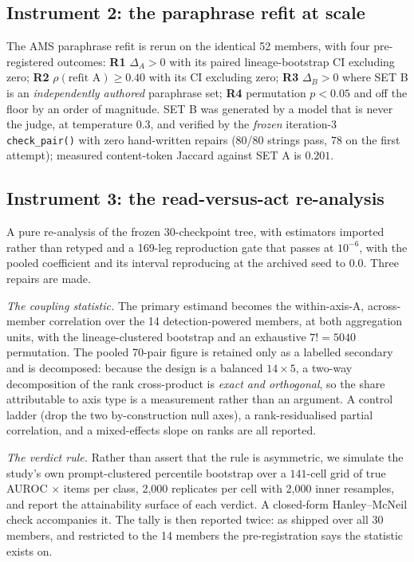 \documentclass[11pt,letterpaper]{article}
\begin{document}
\subsection{Instrument 2: the paraphrase refit at scale}

The AMS paraphrase refit is rerun on the identical 52 members, with four pre-registered outcomes: \textbf{R1} $\Delta_A > 0$ with its paired lineage-bootstrap CI excluding zero; \textbf{R2} $\rho(\text{refit A}) \geq 0.40$ with its CI excluding zero; \textbf{R3} $\Delta_B > 0$ where SET B is an \emph{independently authored} paraphrase set; \textbf{R4} permutation $p < 0.05$ and off the floor by an order of magnitude. SET B was generated by a model that is never the judge, at temperature $0.3$, and verified by the \emph{frozen} iteration-3 \texttt{check\_pair()} with zero hand-written repairs (80/80 strings pass, 78 on the first attempt); measured content-token Jaccard against SET A is $0.201$.

\subsection{Instrument 3: the read-versus-act re-analysis}

A pure re-analysis of the frozen 30-checkpoint tree, with estimators imported rather than retyped and a 169-leg reproduction gate that passes at $10^{-6}$, with the pooled coefficient and its interval reproducing at the archived seed to $0.0$. Three repairs are made.

\emph{The coupling statistic.} The primary estimand becomes the within-axis-A, across-member correlation over the 14 detection-powered members, at both aggregation units, with the lineage-clustered bootstrap and an exhaustive $7! = 5040$ permutation. The pooled 70-pair figure is retained only as a labelled secondary and is decomposed: because the design is a balanced $14 \times 5$, a two-way decomposition of the rank cross-product is \emph{exact and orthogonal}, so the share attributable to axis type is a measurement rather than an argument. A control ladder (drop the two by-construction null axes), a rank-residualised partial correlation, and a mixed-effects slope on ranks are all reported.

\emph{The verdict rule.} Rather than assert that the rule is asymmetric, we simulate the study's own prompt-clustered percentile bootstrap over a $141$-cell grid of true AUROC $\times$ items per class, 2,000 replicates per cell with 2,000 inner resamples, and report the attainability surface of each verdict. A closed-form Hanley--McNeil check accompanies it. The tally is then reported twice: as shipped over all 30 members, and restricted to the 14 members the pre-registration says the statistic exists on.
\end{document}
